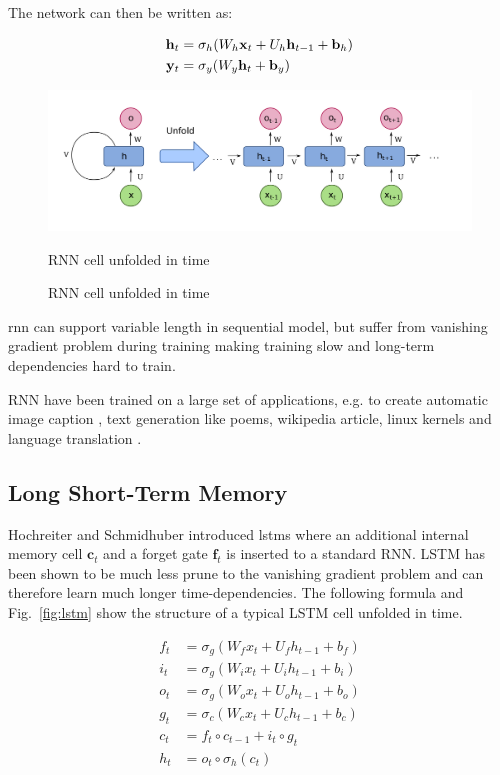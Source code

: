 The network can then be written as:

\begin{align*} 
\mathbf{h}_t &= \sigma_h(W_{h} \mathbf{x}_t + U_{h} \mathbf{h}_{t-1} + \mathbf{b}_h) \\
\mathbf{y}_t &= \sigma_y(W_{y} \mathbf{h}_t + \mathbf{b}_y)
\end{align*}

\begin{figure}[ht]
    \centering
    \includegraphics[width=\textwidth]{figures/rnn.png}
    \ifdefined\SHOWNOTES
    \caption{RNN cell unfolded in time \cite{wikimediaRnn} }
    \else
     \caption{RNN cell unfolded in time \cite{wikimediaRnn}}
     \fi
    \label{fig:rnn}
\end{figure}

\gls{rnn} can support variable length in sequential model, but suffer from vanishing gradient problem during training making training slow and long-term dependencies hard to train.

RNN have been trained on a large set of applications, e.g. to create automatic image caption \cite{karpathy2015deep}, text generation like poems, wikipedia article, linux kernels and language translation \cite{sutskever2011generating}.  

\subsection{Long Short-Term Memory}
Hochreiter and Schmidhuber introduced \glspl{lstm} where an additional internal memory cell $\mathbf{c}_t$ and a forget gate $\mathbf{f}_t$ is inserted to a standard RNN. LSTM has been shown to be much less prune to the vanishing gradient problem and can therefore learn much longer time-dependencies\cite{hochreiter1997long}. The following formula and Fig.~\ref{fig:lstm} show the structure of a typical LSTM cell unfolded in time.

\begin{align*}
f_t &= \sigma_g(W_{f} x_t + U_{f} h_{t-1} + b_f) \\
i_t &= \sigma_g(W_{i} x_t + U_{i} h_{t-1} + b_i) \\
o_t &= \sigma_g(W_{o} x_t + U_{o} h_{t-1} + b_o) \\
g_t &= \sigma_c(W_{c} x_t + U_{c} h_{t-1} + b_c) \\
c_t &= f_t \circ c_{t-1} + i_t \circ g_t  \\
h_t &= o_t \circ \sigma_h(c_t)
\end{align*}

